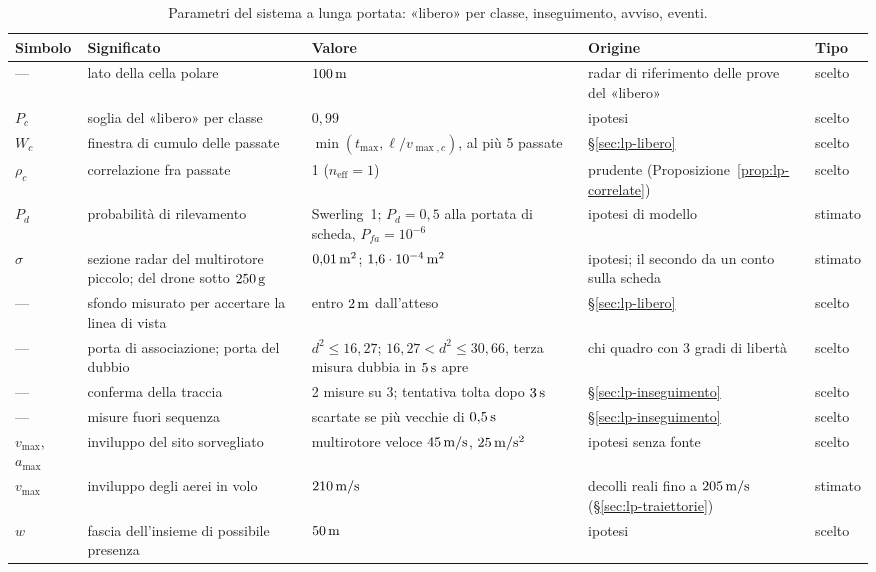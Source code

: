 \begin{table}[H]\centering\footnotesize
\caption{Parametri del sistema a lunga portata: «libero» per classe, inseguimento, avviso, eventi.}\label{tab:par-lunga}
\begin{tabularx}{\linewidth}{@{}p{1.25cm}Lp{3.5cm}Lp{1.2cm}@{}}
\toprule
Simbolo & Significato & Valore & Origine & Tipo\\
\midrule
--- & lato della cella polare & $100\,\mathrm{m}$ & radar di riferimento delle prove del «libero» & scelto\\
$P_c$ & soglia del «libero» per classe & $0{,}99$ & ipotesi & scelto\\
$W_c$ & finestra di cumulo delle passate & $\min(t_{\max},\ell/v_{\max,c})$, al più 5 passate & \S\ref{sec:lp-libero} & scelto\\
$\rho_c$ & correlazione fra passate & 1 ($n_{\mathrm{eff}}=1$) & prudente (Proposizione~\ref{prop:lp-correlate}) & scelto\\
$P_d$ & probabilità di rilevamento & Swerling~1; $P_d=0{,}5$ alla portata di scheda, $P_{fa}=10^{-6}$ & ipotesi di modello & stimato\\
$\sigma$ & sezione radar del multirotore piccolo; del drone sotto $250\,\mathrm{g}$ & $0{,}01\,\mathrm{m^2}$; $1{,}6\cdot10^{-4}\,\mathrm{m^2}$ & ipotesi; il secondo da un conto sulla scheda & stimato\\
--- & sfondo misurato per accertare la linea di vista & entro $2\,\mathrm{m}$ dall'atteso & \S\ref{sec:lp-libero} & scelto\\
--- & porta di associazione; porta del dubbio & $d^2\le16{,}27$; $16{,}27<d^2\le30{,}66$, terza misura dubbia in $5\,\mathrm{s}$ apre & chi quadro con 3 gradi di libertà & scelto\\
--- & conferma della traccia & 2 misure su 3; tentativa tolta dopo $3\,\mathrm{s}$ & \S\ref{sec:lp-inseguimento} & scelto\\
--- & misure fuori sequenza & scartate se più vecchie di $0{,}5\,\mathrm{s}$ & \S\ref{sec:lp-inseguimento} & scelto\\
$v_{\max}$, $a_{\max}$ & inviluppo del sito sorvegliato & multirotore veloce $45\,\mathrm{m/s}$, $25\,\mathrm{m/s^2}$ & ipotesi senza fonte & scelto\\
$v_{\max}$ & inviluppo degli aerei in volo & $210\,\mathrm{m/s}$ & decolli reali fino a $205\,\mathrm{m/s}$ (\S\ref{sec:lp-traiettorie}) & stimato\\
$w$ & fascia dell'insieme di possibile presenza & $50\,\mathrm{m}$ & ipotesi & scelto\\

\end{tabularx}
\end{table}

